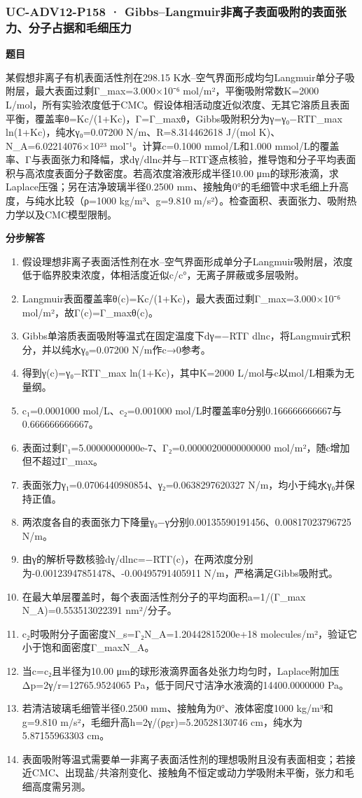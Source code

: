 \documentclass[UTF8,11pt,a4paper]{ctexart}
\begin{document}
\subsubsection*{UC-ADV12-P158 · Gibbs–Langmuir非离子表面吸附的表面张力、分子占据和毛细压力}
\noindent\textbf{题目}\par
某假想非离子有机表面活性剂在298.15 K水–空气界面形成均匀Langmuir单分子吸附层，最大表面过剩Γ\_max=3.000×10⁻⁶ mol/m²，平衡吸附常数K=2000 L/mol，所有实验浓度低于CMC。假设体相活动度近似浓度、无其它溶质且表面平衡，覆盖率θ=Kc/(1+Kc)，Γ=Γ\_maxθ，Gibbs吸附积分为γ=γ₀−RTΓ\_max ln(1+Kc)，纯水γ₀=0.07200 N/m、R=8.314462618 J/(mol K)、N\_A=6.02214076×10²³ mol⁻¹。计算c=0.1000 mmol/L和1.000 mmol/L的覆盖率、Γ与表面张力和降幅，求dγ/dlnc并与−RTΓ逐点核验，推导饱和分子平均表面积与高浓度表面分子数密度。若高浓度溶液形成半径10.00 μm的球形液滴，求Laplace压强；另在洁净玻璃半径0.2500 mm、接触角0°的毛细管中求毛细上升高度，与纯水比较（ρ=1000 kg/m³、g=9.810 m/s²）。检查面积、表面张力、吸附热力学以及CMC模型限制。\par
\medskip\noindent\textbf{分步解答}
\begin{enumerate}
\item 假设理想非离子表面活性剂在水–空气界面形成单分子Langmuir吸附层，浓度低于临界胶束浓度，体相活度近似c/c°，无离子屏蔽或多层吸附。
\item Langmuir表面覆盖率θ(c)=Kc/(1+Kc)，最大表面过剩Γ\_max=3.000×10⁻⁶ mol/m²，故Γ(c)=Γ\_maxθ(c)。
\item Gibbs单溶质表面吸附等温式在固定温度下dγ=−RTΓ dlnc，将Langmuir式积分，并以纯水γ₀=0.07200 N/m作c→0参考。
\item 得到γ(c)=γ₀−RTΓ\_max ln(1+Kc)，其中K=2000 L/mol与c以mol/L相乘为无量纲。
\item c₁=0.0001000 mol/L、c₂=0.001000 mol/L时覆盖率θ分别0.166666666667与0.666666666667。
\item 表面过剩Γ₁=5.00000000000e-7、Γ₂=0.00000200000000000 mol/m²，随c增加但不超过Γ\_max。
\item 表面张力γ₁=0.0706440980854、γ₂=0.0638297620327 N/m，均小于纯水γ₀并保持正值。
\item 两浓度各自的表面张力下降量γ₀−γ分别0.00135590191456、0.00817023796725 N/m。
\item 由γ的解析导数核验dγ/dlnc=−RTΓ(c)，在两浓度分别为-0.00123947851478、-0.00495791405911 N/m，严格满足Gibbs吸附式。
\item 在最大单层覆盖时，每个表面活性剂分子的平均面积a=1/(Γ\_max N\_A)=0.553513022391 nm²/分子。
\item c₂时吸附分子面密度N\_s=Γ₂N\_A=1.20442815200e+18 molecules/m²，验证它小于饱和面密度Γ\_maxN\_A。
\item 当c=c₂且半径为10.00 μm的球形液滴界面各处张力均匀时，Laplace附加压Δp=2γ/r=12765.9524065 Pa，低于同尺寸洁净水液滴的14400.0000000 Pa。
\item 若清洁玻璃毛细管半径0.2500 mm、接触角为0°、液体密度1000 kg/m³和g=9.810 m/s²，毛细升高h=2γ/(ρgr)=5.20528130746 cm，纯水为5.87155963303 cm。
\item 表面吸附等温式需要单一非离子表面活性剂的理想吸附且没有表面相变；若接近CMC、出现盐/共溶剂变化、接触角不恒定或动力学吸附未平衡，张力和毛细高度需另测。
\end{enumerate}
\end{document}
